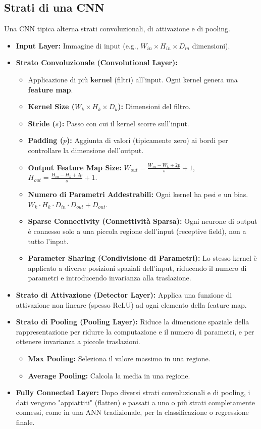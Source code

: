 \documentclass[a4paper,11pt]{article}
\begin{document}
\subsection{Strati di una CNN}
Una CNN tipica alterna strati convoluzionali, di attivazione e di pooling.
\begin{itemize}
    \item \textbf{Input Layer:} Immagine di input (e.g., $W_{in} \times H_{in} \times D_{in}$ dimensioni).
    \item \textbf{Strato Convoluzionale (Convolutional Layer):}
    \begin{itemize}
        \item Applicazione di più \textbf{kernel} (filtri) all'input. Ogni kernel genera una \textbf{feature map}.
        \item \textbf{Kernel Size ($W_k \times H_k \times D_k$):} Dimensioni del filtro.
        \item \textbf{Stride ($s$):} Passo con cui il kernel scorre sull'input.
        \item \textbf{Padding ($p$):} Aggiunta di valori (tipicamente zero) ai bordi per controllare la dimensione dell'output.
        \item \textbf{Output Feature Map Size:} $W_{out} = \frac{W_{in} - W_k + 2p}{s} + 1$, $H_{out} = \frac{H_{in} - H_k + 2p}{s} + 1$.
        \item \textbf{Numero di Parametri Addestrabili:} Ogni kernel ha pesi e un bias. $W_k \cdot H_k \cdot D_{in} \cdot D_{out} + D_{out}$.
        \item \textbf{Sparse Connectivity (Connettività Sparsa):} Ogni neurone di output è connesso solo a una piccola regione dell'input (receptive field), non a tutto l'input.
        \item \textbf{Parameter Sharing (Condivisione di Parametri):} Lo stesso kernel è applicato a diverse posizioni spaziali dell'input, riducendo il numero di parametri e introducendo invarianza alla traslazione.
    \end{itemize}
    \item \textbf{Strato di Attivazione (Detector Layer):} Applica una funzione di attivazione non lineare (spesso ReLU) ad ogni elemento della feature map.
    \item \textbf{Strato di Pooling (Pooling Layer):} Riduce la dimensione spaziale della rappresentazione per ridurre la computazione e il numero di parametri, e per ottenere invarianza a piccole traslazioni.
    \begin{itemize}
        \item \textbf{Max Pooling:} Seleziona il valore massimo in una regione.
        \item \textbf{Average Pooling:} Calcola la media in una regione.
    \end{itemize}
    \item \textbf{Fully Connected Layer:} Dopo diversi strati convoluzionali e di pooling, i dati vengono "appiattiti" (flatten) e passati a uno o più strati completamente connessi, come in una ANN tradizionale, per la classificazione o regressione finale.
\end{itemize}
\end{document}
